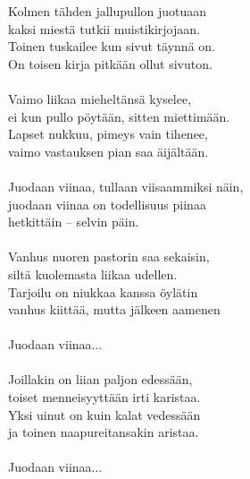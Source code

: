 
            Kolmen tähden jallupullon juotuaan \\
            kaksi miestä tutkii muistikirjojaan. \\
            Toinen tuskailee kun sivut täynnä on. \\
            On toisen kirja pitkään ollut sivuton. \\
\hspace{10mm} \\
            Vaimo liikaa mieheltänsä kyselee, \\
            ei kun pullo pöytään, sitten miettimään. \\
            Lapset nukkuu, pimeys vain tihenee, \\
            vaimo vastauksen pian saa äijältään. \\
\hspace{10mm} \\
            Juodaan viinaa, tullaan viisaammiksi näin, \\
            juodaan viinaa on todellisuus piinaa \\
            hetkittäin – selvin päin. \\
\hspace{10mm} \\
            Vanhus nuoren pastorin saa sekaisin, \\
            siltä kuolemasta liikaa udellen. \\
            Tarjoilu on niukkaa kanssa öylätin \\
            vanhus kiittää, mutta jälkeen aamenen \\
\hspace{10mm} \\
            Juodaan viinaa... \\
\hspace{10mm} \\
            Joillakin on liian paljon edessään, \\
            toiset menneisyyttään irti karistaa. \\
            Yksi uinut on kuin kalat vedessään \\
            ja toinen naapureitansakin aristaa. \\
\hspace{10mm} \\
            Juodaan viinaa... \\

